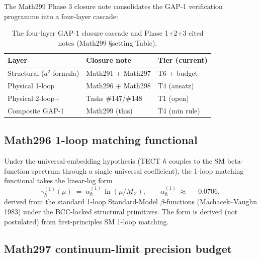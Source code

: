 The Math299 Phase 3 closure note consolidates the GAP-1 verification
programme into a four-layer cascade:

\begin{table}[h]
\centering
\caption{The four-layer GAP-1 closure cascade and Phase 1+2+3 cited
notes (Math299 §setting Table).}
\label{tab:cascade}
\begin{tabular}{l|l|l}
\hline
Layer & Closure note & Tier (current) \\
\hline
Structural ($a^2$ formula) & Math291 + Math297 & T6 + budget \\
Physical 1-loop & Math296 + Math298 & T4 (ansatz) \\
Physical 2-loop$+$ & Tasks \#147/\#148 & T1 (open) \\
Composite GAP-1 & Math299 (this) & T4 (min rule) \\
\hline
\end{tabular}
\end{table}

\subsection{Math296 1-loop matching functional}

\begin{theorem}
\label{thm:Math296}
Under the universal-embedding hypothesis (TECT $\hbar$ couples to
the SM beta-function spectrum through a single universal
coefficient), the 1-loop matching functional takes the linear-log
form
\begin{equation}
\gamma_\hbar^{(1)}(\mu) \;=\; \alpha_\hbar^{(1)}\,\ln(\mu/M_Z),
\qquad
\alpha_\hbar^{(1)} \;\approx\; -0.0706,
\end{equation}
derived from the standard 1-loop Standard-Model $\beta$-functions
(Machacek--Vaughn 1983) under the BCC-locked structural primitives.
The form is derived (not postulated) from first-principles SM
1-loop matching.
\end{theorem}

\subsection{Math297 continuum-limit precision budget}

